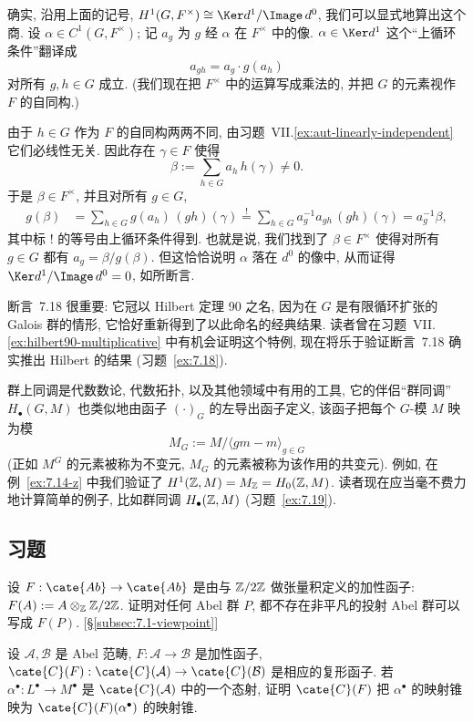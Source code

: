 确实, 沿用上面的记号, $H^1(G,F^\times)\cong\Ker d^1/\Image\,d^0$, 我们可以显式地算出这个商. 设 $\alpha\in C^1(G,F^\times)$; 记 $a_g$ 为 $g$ 经 $\alpha$ 在 $F^\times$ 中的像. $\alpha\in\Ker d^1$ 这个``上循环条件''翻译成
\[
a_{gh}=a_g\cdot g(a_h)
\]
对所有 $g,h\in G$ 成立. (我们现在把 $F^\times$ 中的运算写成乘法的, 并把 $G$ 的元素视作 $F$ 的自同构.)

由于 $h\in G$ 作为 $F$ 的自同构两两不同, 由习题~VII.\ref{ex:aut-linearly-independent} 它们必线性无关. 因此存在 $\gamma\in F$ 使得
\[
\beta:=\sum_{h\in G}a_h\,h(\gamma)\neq 0.
\]
于是 $\beta\in F^\times$, 并且对所有 $g\in G$,
\[
\begin{aligned}
g(\beta)&=\sum_{h\in G}g(a_h)\,(gh)(\gamma)
\overset{!}{=}\sum_{h\in G}a_g^{-1}a_{gh}\,(gh)(\gamma)
=a_g^{-1}\beta,
\end{aligned}
\]
其中标 $!$ 的等号由上循环条件得到. 也就是说, 我们找到了 $\beta\in F^\times$ 使得对所有 $g\in G$ 都有 $a_g=\beta/g(\beta)$. 但这恰恰说明 $\alpha$ 落在 $d^0$ 的像中, 从而证得 $\Ker d^1/\Image\,d^0=0$, 如所断言.

断言~7.18 很重要: 它冠以 Hilbert 定理 90 之名, 因为在 $G$ 是有限循环扩张的 Galois 群的情形, 它恰好重新得到了以此命名的经典结果. 读者曾在习题~VII.\ref{ex:hilbert90-multiplicative} 中有机会证明这个特例, 现在将乐于验证断言~7.18 确实推出 Hilbert 的结果 (习题~\ref{ex:7.18}).

群上同调是代数数论, 代数拓扑, 以及其他领域中有用的工具, 它的伴侣``群同调'' $H_\bullet(G,M)$ 也类似地由函子 $(\cdot)_G$ 的左导出函子定义, 该函子把每个 $G$-模 $M$ 映为模
\[
M_G := M/\langle g m - m\rangle_{g\in G}
\]
(正如 $M^G$ 的元素被称为不变元, $M_G$ 的元素被称为该作用的共变元). 例如, 在例~\ref{ex:7.14-z} 中我们验证了 $H^1(\mathbb{Z},M)=M_{\mathbb{Z}}=H_0(\mathbb{Z},M)$. 读者现在应当毫不费力地计算简单的例子, 比如群同调 $H_\bullet(\mathbb{Z},M)$ (习题~\ref{ex:7.19}).

\subsection*{习题}
{}

\begin{prob}\label{ex:7.1}
设 $F:\cate{Ab}\to\cate{Ab}$ 是由与 $\mathbb{Z}/2\mathbb{Z}$ 做张量积定义的加性函子: $F(A):=A\otimes_{\mathbb{Z}}\mathbb{Z}/2\mathbb{Z}$. 证明对任何 Abel 群 $P$, 都不存在非平凡的投射 Abel 群可以写成 $F(P)$. [\S\ref{subsec:7.1-viewpoint}]
\end{prob}

\begin{prob}\label{ex:7.2}
设 $\mathcal{A},\mathcal{B}$ 是 Abel 范畴, $F:\mathcal{A}\to\mathcal{B}$ 是加性函子, $\cate{C}(F):\cate{C}(\mathcal{A})\to\cate{C}(\mathcal{B})$ 是相应的复形函子. 若 $\alpha^\bullet:L^\bullet\to M^\bullet$ 是 $\cate{C}(\mathcal{A})$ 中的一个态射, 证明 $\cate{C}(F)$ 把 $\alpha^\bullet$ 的映射锥映为 $\cate{C}(F)(\alpha^\bullet)$ 的映射锥.
\end{prob}

